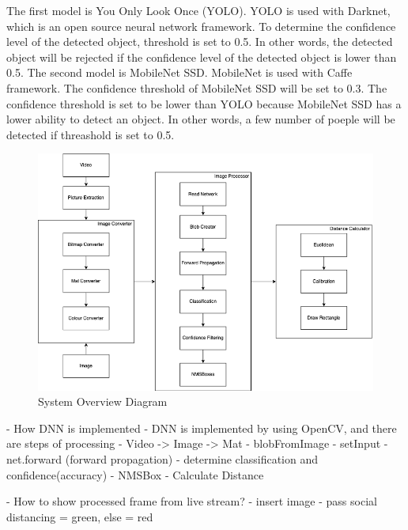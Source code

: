 
        The first model is You Only Look Once (YOLO).
            YOLO is used with Darknet, which is an open source neural network framework.
            To determine the confidence level of the detected object, threshold is set to 0.5.
            In other words, the detected object will be rejected if the confidence level of the detected object is lower than 0.5.
        The second model is MobileNet SSD. MobileNet is used with Caffe framework.
            The confidence threshold of MobileNet SSD will be set to 0.3.
            The confidence threshold is set to be lower than YOLO because MobileNet SSD has a lower ability to detect an object.
            In other words, a few number of poeple will be detected if threashold is set to 0.5.

        \begin{figure}[!ht]
            \centering
            \includegraphics[width=5in]{images/chapter3/system-overview.png}
            \caption{System Overview Diagram}
            \label{systemOverview}
        \end{figure}

        -	How DNN is implemented
            - DNN is implemented by using OpenCV, and there are steps of processing
                - Video -> Image -> Mat
                - blobFromImage
                - setInput
                - net.forward (forward propagation)
                - determine classification and confidence(accuracy)
                - NMSBox
                - Calculate Distance

            - How to show processed frame from live stream?
            - insert image
        - pass social distancing = green, else = red

